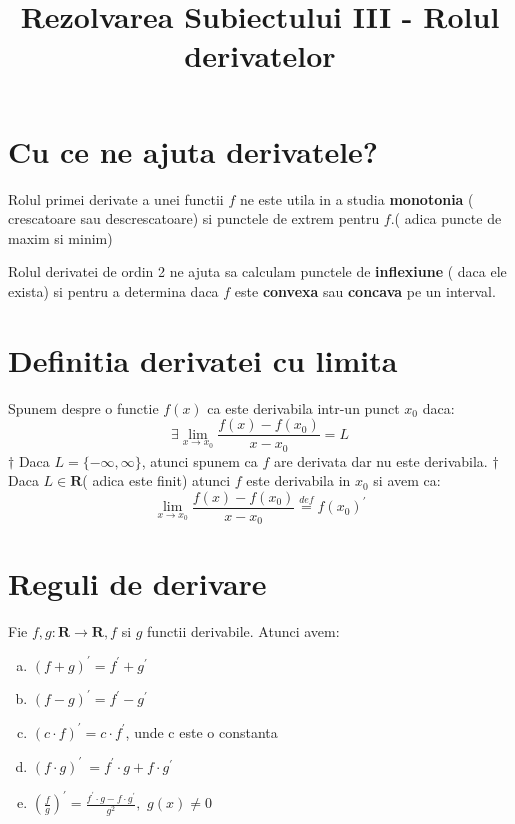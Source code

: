 \documentclass[11pt]{article}
\title{Rezolvarea Subiectului III - Rolul derivatelor}
\author{\Name}
\date{}
\begin{document}
\maketitle

\section*{Cu ce ne ajuta derivatele?}
    \begin{flushleft}
        \qquad Rolul primei derivate a unei functii $f$ ne este utila in a studia \textbf{monotonia} ( 
        crescatoare sau descrescatoare) si punctele de extrem pentru $f$.( adica puncte de maxim si minim)
    \end{flushleft}
    
    \begin{flushleft}
        \qquad Rolul derivatei de ordin 2 ne ajuta sa calculam punctele de \textbf{inflexiune}
        ( daca ele exista) si pentru a determina daca $f$ este \textbf{convexa} sau \textbf{concava}
        pe un interval.
    \end{flushleft}

\section*{Definitia derivatei cu limita}
    \begin{flushleft}
    \qquad Spunem despre o functie $f(x)$ ca este derivabila intr-un punct $x_0$ daca:
        \[ \exists \lim_{x \to x_0} \frac{f(x) - f(x_0)}{x - x_0} = L \]
         $\dagger$ Daca $L = \{-\infty, \infty\}$, atunci spunem ca $f$ are derivata dar nu este derivabila.
        \newline
        $\dagger$ Daca $L \in \mathbf{R}$( adica este finit) atunci $f$ este derivabila in $x_0$ si avem ca:
        \[ \lim_{x \to x_0} \frac{f(x) - f(x_0)}{x - x_0} \stackrel{\textit{def}}{=} f(x_0)^\prime  \]
    \end{flushleft}
    
\section*{Reguli de derivare}
    \begin{flushleft}
        \qquad Fie $f,g: \mathbf{R} \to  \mathbf{R}, f $ si $g$ functii derivabile. Atunci avem:  
        \begin{enumerate}[(a).]
            \item $ (f+g)^\prime = f^\prime + g^\prime$
            \item $(f - g)^\prime = f^\prime - g^\prime$
            \item $ (c \cdot f)^\prime = c\cdot f^\prime$, unde c este o constanta
            \item $ (f\cdot g)^\prime\ = f^\prime \cdot g + f \cdot g^\prime $
            \item $ \left( \frac{f}{g} \right) ^\prime = \frac{f^\prime \cdot g - f \cdot g^\prime}{g^2},
            \, \, g(x) \neq 0 $
        \end{enumerate} 
    \end{flushleft}
\newpage
\end{document}
